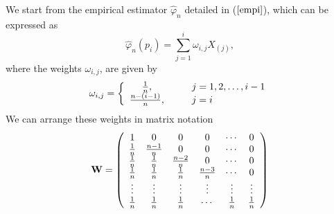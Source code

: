 \documentclass[preprint,12pt]{elsarticle}
\begin{document}
We start from the empirical estimator $\widehat{\varphi}_n$ detailed in ($\ref{empi}$), which can be expressed as
\[
\widehat{\varphi}_n(p_i)=\sum_{j=1}^i\omega_{i,j} X_{(j)},
\] 
where the weights $\omega_{i,j}$, are given by 
\[
\omega_{i,j}=\left\{\begin{array}{cll}
\frac{1}{n}, & \hspace{0.3cm}& j= 1,2, \ldots, i-1 \\
\frac{n-(i-1)}{n},& \hspace{0.3cm}& j= i \\
\end{array}\right.
\]
We can arrange these weights in matrix notation
\[
{\bf W} =\left(
\begin{array}{cccccc}
1 & 0 &0 &0& \cdots &0 \\
\frac{1}{n} & \frac{n-1}{n}&0&0&\cdots& 0 \\
\frac{1}{n} & \frac{1}{n}&\frac{n-2}{n}&0&\cdots& 0 \\
\frac{1}{n} & \frac{1}{n}&\frac{1}{n}&\frac{n-3}{n}&\cdots& 0 \\
\vdots&\vdots&\vdots&\vdots&\vdots&\vdots \\
\frac{1}{n} & \frac{1}{n}&\frac{1}{n}&\cdots&\frac{1}{n}& \frac{1}{n} \\
\end{array}
\right)
\]
\end{document}
